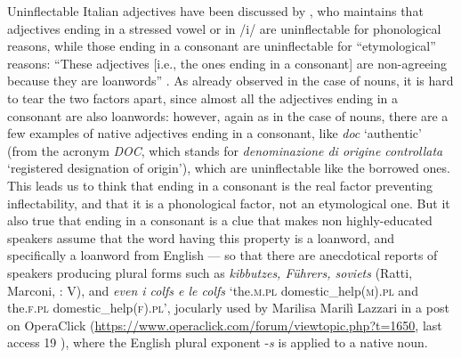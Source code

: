 \documentclass[output=paper]{langscibook}
\begin{document}
Uninflectable Italian adjectives have been discussed by \citet{Fedden2019}, who maintains that adjectives ending in a stressed vowel or in /i/ are uninflectable for phonological reasons, while those ending in a consonant are uninflectable for “etymological” reasons: “These adjectives [i.e., the ones ending in a consonant] are non-agreeing because they are loanwords” \citep[308]{Fedden2019}. As already observed in the case of nouns, it is hard to tear the two factors apart, since almost all the adjectives ending in a consonant are also loanwords: however, again as in the case of nouns, there are a few examples of native adjectives ending in a consonant, like \textit{doc} ‘authentic’ (from the acronym \textit{DOC}, which stands for \textit{denominazione di origine controllata} ‘registered designation of origin’), which are uninflectable like the borrowed ones. This leads us to think that ending in a consonant is the real factor preventing inflectability, and that it is a phonological factor, not an etymological one. But it also true that ending in a consonant is a clue that makes non highly-educated speakers assume that the word having this property is a loanword, and specifically a loanword from English — so that there are anecdotical reports of speakers producing plural forms such as \textit{kibbutzes, Führers, soviets} (Ratti, Marconi, \citealt{MorgaviRolando1988}: V), and \textit{even i colfs e le colfs} ‘the.\textsc{m.pl} domestic\_help(\textsc{m}).\textsc{pl} and the.\textsc{f.pl} domestic\_help(\textsc{f}).\textsc{pl}’, jocularly used by Marilisa Marilì Lazzari in a post on OperaClick (\url{https://www.operaclick.com/forum/viewtopic.php?t=1650}{, last access 19 \citealt{May2024}}), where the English plural exponent \nobreakdash-\textit{s} is applied to a native noun. 
\end{document}

